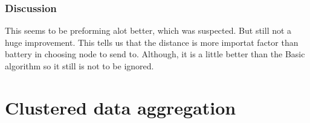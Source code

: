 \documentclass{article}
\begin{document}
    \section{Discussion}
      This seems to be preforming alot better, which was suspected. But still not a huge
      improvement. This tells us that the distance is more importat factor than battery
      in choosing node to send to. Although, it is a little better than the Basic algorithm
      so it still is not to be ignored.
\part{Clustered data aggregation}
  
\end{document}
